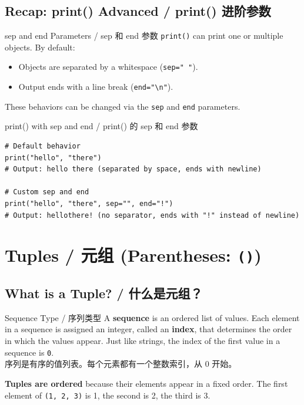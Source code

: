 \documentclass[11pt,a4paper]{report}
\let\oldtexttt\texttt
\renewcommand{\texttt}[1]{\textcolor{mainblue}{\oldtexttt{#1}}}
\begin{document}
\subsection{Recap: print() Advanced / print() 进阶参数}

\begin{concept}{sep and end Parameters / sep 和 end 参数}
    \texttt{print()} can print one or multiple objects. By default:
    \begin{itemize}
        \item Objects are separated by a whitespace (\texttt{sep=" "}).
        \item Output ends with a line break (\texttt{end="\textbackslash n"}).
    \end{itemize}
    These behaviors can be changed via the \texttt{sep} and \texttt{end} parameters.
\end{concept}

\begin{examplebox}{print() with sep and end / print() 的 sep 和 end 参数}
\begin{lstlisting}
# Default behavior
print("hello", "there")
# Output: hello there (separated by space, ends with newline)

# Custom sep and end
print("hello", "there", sep="", end="!")
# Output: hellothere! (no separator, ends with "!" instead of newline)
\end{lstlisting}
\end{examplebox}

\section{Tuples / 元组 (Parentheses: \texttt{()})}

\subsection{What is a Tuple? / 什么是元组？}

\begin{concept}{Sequence Type / 序列类型}
    A \textbf{sequence} is an ordered list of values. Each element in a sequence is assigned an integer, called an \textbf{index}, that determines the order in which the values appear. Just like strings, the index of the first value in a sequence is \texttt{0}. \\
    序列是有序的值列表。每个元素都有一个整数索引，从 0 开始。

    \textbf{Tuples are ordered} because their elements appear in a fixed order. The first element of \texttt{(1, 2, 3)} is 1, the second is 2, the third is 3.
\end{concept}
\end{document}
